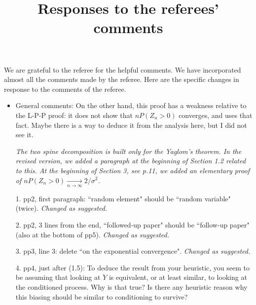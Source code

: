 \documentclass[12pt,a4paper]{amsart}
\title[Responses]{\large Responses to the referees' comments}
\numberwithin{equation}{section}
\begin{document}
\maketitle	
	We are grateful to the referee for the helpful comments.
	We have incorporated almost all the comments made by the referee.
	Here are the specific changes in response to the comments of the referee.
\\
\begin{itemize}
\item
	General comments: On the other hand, this proof has a weakness relative to the L-P-P proof: it does not show that $n P(Z_n > 0)$ converges, and uses that fact.
	Maybe there is a way to deduce it from the analysis here, but I did not see it.
	
	{\it 
  The two spine decomposition is built only for the Yaglom's theorem.
	In the revised version, we added a paragraph at the beginning of Section 1.2 related to this.
   At the beginning of Section 3, see p.11,  we added an elementary proof of $n P(Z_n > 0) \xrightarrow[n\to \infty]{} 2/ \sigma^2$.
  }
\\	
\item[1.]
	pp2, first paragraph: ``random element" should be ``random variable" (twice).
	{\it Changed as suggested.}
\\	
\item[2.]
	pp2, 3 lines from the end, ``followed-up paper" should be ``follow-up paper" (also at the bottom of pp5).
	{\it Changed as suggested.}
\\
\item[3.]
	pp3, line 3: delete ``on the exponential convergence".
	{\it Changed as suggested.}
\\
\item[4.]
	pp4, just after (1.5): To deduce the result from your heuristic, you seem to be assuming that looking at $\ddot Y$ is equivalent, or at least similar, to looking at the conditioned process.
	Why is that true?
	Is there any heuristic reason why this biasing should be similar to conditioning to survive?
	

\end{itemize}
\end{document}
